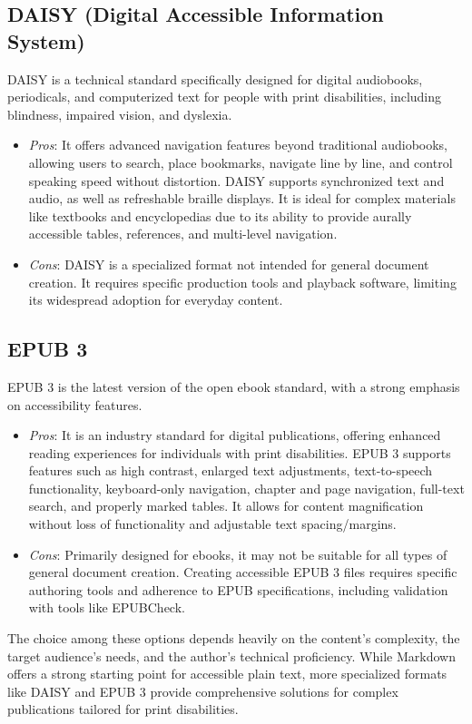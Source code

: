 \subsection{DAISY (Digital Accessible Information System)}
DAISY is a technical standard specifically designed for digital audiobooks, periodicals, and computerized text for people with print disabilities, including blindness, impaired vision, and dyslexia. \cite{DAISYWiki}
\begin{itemize}
    \item \emph{Pros}: It offers advanced navigation features beyond traditional audiobooks, allowing users to search, place bookmarks, navigate line by line, and control speaking speed without distortion. \cite{DAISYWiki, SnowDAISY} DAISY supports synchronized text and audio, as well as refreshable braille displays. \cite{DAISYWiki, SnowDAISY} It is ideal for complex materials like textbooks and encyclopedias due to its ability to provide aurally accessible tables, references, and multi-level navigation. \cite{DAISYWiki}
    \item \emph{Cons}: DAISY is a specialized format not intended for general document creation. It requires specific production tools and playback software, limiting its widespread adoption for everyday content. \cite{DAISYWiki, SnowDAISY}
\end{itemize}

\subsection{EPUB 3}
EPUB 3 is the latest version of the open ebook standard, with a strong emphasis on accessibility features. \cite{ElsevierEPUB3, CNIBEPUB}
\begin{itemize}
    \item \emph{Pros}: It is an industry standard for digital publications, offering enhanced reading experiences for individuals with print disabilities. \cite{ElsevierEPUB3} EPUB 3 supports features such as high contrast, enlarged text adjustments, text-to-speech functionality, keyboard-only navigation, chapter and page navigation, full-text search, and properly marked tables. \cite{ElsevierEPUB3} It allows for content magnification without loss of functionality and adjustable text spacing/margins. \cite{ElsevierEPUB3}
    \item \emph{Cons}: Primarily designed for ebooks, it may not be suitable for all types of general document creation. Creating accessible EPUB 3 files requires specific authoring tools and adherence to EPUB specifications, including validation with tools like EPUBCheck. \cite{CNIBEPUB}
\end{itemize}
The choice among these options depends heavily on the content's complexity, the target audience's needs, and the author's technical proficiency. While Markdown offers a strong starting point for accessible plain text, more specialized formats like DAISY and EPUB 3 provide comprehensive solutions for complex publications tailored for print disabilities.

